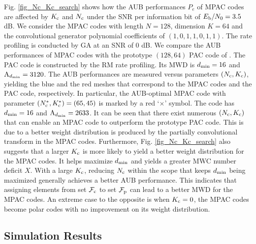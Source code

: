 \documentclass[12pt, draftclsnofoot, peerreview, onecolumn]{IEEEtran}
\theoremstyle{noparent}
\begin{document}
Fig. \ref{fig_Nc_Kc_search} shows how the AUB performances $P_e$ of MPAC codes are affected
by $K_{\rm c}$ and $N_{\rm c}$ under the SNR per information bit of $E_{\rm b} / N_0=3.5$ dB.
We consider the MPAC codes with length $N=128$, dimension $K=64$ and the 
convolutional generator polynomial coefficients of $(1,0,1,1,0,1,1)$.
The rate profiling is conducted by GA at an SNR of $0$ dB.
We compare the AUB performances of MPAC codes with the prototype $(128, 64)$ PAC code of \cite{Arikan2019sequentialdecodingchannel}.
The PAC code is constructed by the RM rate profiling.
Its MWD is $d_{\rm min}=16$ and ${\rm A}_{d_{\rm min}}=3120$.
The AUB performances are measured versus parameters $(N_{\rm c},K_{\rm c})$, 
yielding the blue and the red meshes that correspond to the MPAC codes and the PAC code,
respectively.
In particular, the AUB-optimal MPAC code
with parameter $(N_{\rm c}^*,K_{\rm c}^*)=(65,45)$
is marked by a red `$\times$' symbol.
The code has $d_{\rm min}=16$ and ${\rm A}_{d_{\rm min}}=2633$.
It can be seen that there exist numerous $(N_{\rm c},K_{\rm c})$ 
that can enable an MPAC code to outperform the prototype PAC code.
This is due to a better weight distribution is produced by 
the partially convolutional transform in the MPAC codes.
Furthermore, Fig. \ref{fig_Nc_Kc_search} also suggests that 
a larger $K_{\rm c}$ is more likely to yield a better weight distribution for the MPAC codes.
It helps maximize $d_{\rm min}$ and 
yields a greater MWC number deficit $X$.
With a large $K_{\rm c}$, reducing $N_{\rm c}$ within the
scope that keeps $d_{\rm min}$ being maximized generally achieves a better AUB performance. 
This indicates that assigning elements from set $\mathcal{F}_{\rm c}$ to set $\mathcal{F}_{\rm p}$ can lead to a better MWD for the MPAC codes. 
An extreme case to the opposite is when $K_{\rm c}=0$,
the MPAC codes become polar codes with no improvement on its weight distribution.





















\subsection{Simulation Results}
\label{sec4_Simulation_Results}
\end{document}
